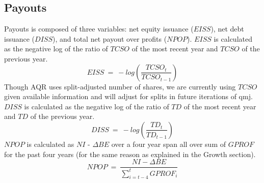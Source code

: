 \documentclass[titlepage]{article}
\begin{document}
\subsection*{Payouts}
Payouts is composed of three variables: net equity issuance ($EISS$), net debt issuance ($DISS$), and total net payout over profits ($NPOP$). $EISS$ is calculated as the negative log of the ratio of $TCSO$ of the most recent year and $TCSO$ of the previous year. $$EISS \ = \ -log\left(\frac{TCSO_t}{TCSO_{t-1}}\right)$$ Though AQR uses split-adjusted number of shares, we are currently using $TCSO$ given available information and will adjust for splits in future iterations of qmj. $DISS$ is calculated as the negative log of the ratio of $TD$ of the most recent year and $TD$ of the previous year. $$DISS \ = \ -log\left(\frac{TD_t}{TD_{t-1}}\right)$$ $NPOP$ is calculated as $NI$ - $\Delta BE$ over a four year span all over sum of $GPROF$ for the past four years (for the same reason as explained in the Growth section). $$NPOP \ = \ \frac{NI - \Delta BE}{\sum_{i=t-4}^{t}GPROF_i}$$
\end{document}
